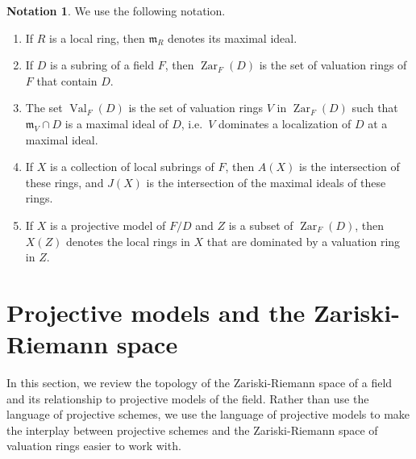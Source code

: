 \documentclass[preprint, 11pt,nonatbib]{elsarticle}
\DeclareMathOperator{\Dom}{Val}
\DeclareMathOperator{\Zar}{Zar}
\theoremstyle{definition}
\newtheorem{notation}[theorem]{Notation}
\numberwithin{theorem}{section}
\begin{document}

\begin{notation}
We use the following notation.
\begin{enumerate} 
\item
If $R$ is a local ring, then ${\mathfrak{m}}_R$ denotes its maximal ideal.
\item
If $D$ is a subring of a field $F$, then 
$\Zar_F(D)$ is the set of valuation rings of $F$ that contain $D$.
\item

The set $\Dom_F(D)$ is the set of valuation rings $V$ in $\Zar_F(D)$ such that $\mathfrak m_V \cap D$ is a maximal ideal of $D$, i.e.\ $V$ dominates a localization of $D$ at a maximal ideal.  
 \item
If $X$ is a collection of local subrings of $F$, then $A(X)$ is the intersection of these rings, and $J(X)$ is the intersection of the maximal ideals of these rings. 
\item
If $X$ is a projective model of $F/D$  and $Z$ is a subset of $\Zar_F(D)$, then $X(Z)$ denotes the local rings in $X$ that are dominated by a valuation ring in $Z$.
\end{enumerate}

\end{notation}

   

\section{Projective models and the Zariski-Riemann space}



 In this section, we review the topology of the Zariski-Riemann space of a field and its relationship to projective models of the field.
Rather than use the language of projective schemes, we use the language of projective models to make the interplay between projective schemes and the Zariski-Riemann space of valuation rings easier to work with.
\end{document}
